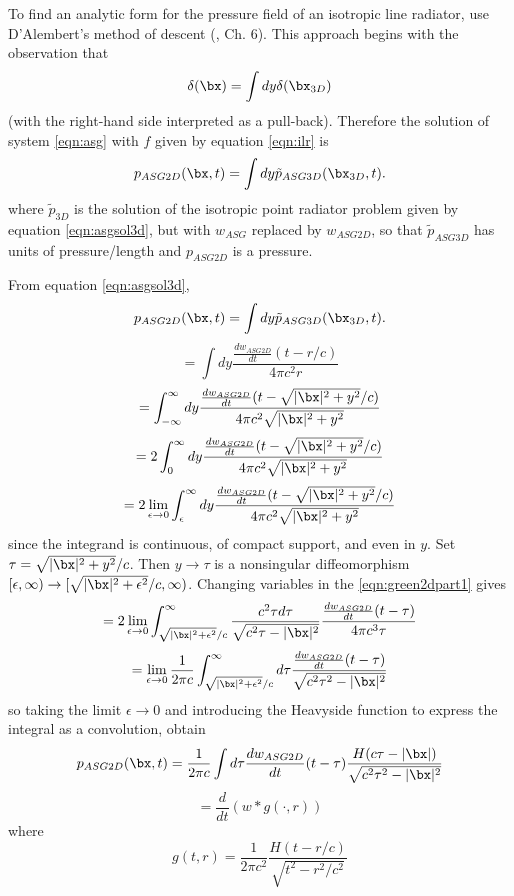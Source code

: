 To find an analytic form for the pressure field of an isotropic line radiator, use D'Alembert's method of descent (\cite{CourHil:62}, Ch. 6). This approach begins with the observation that
\[
\delta(\bx) = \int dy \delta(\bx_{3D})
\]
(with the right-hand side interpreted as a pull-back). Therefore the solution of system \ref{eqn:asg} with $f$ given by equation \ref{eqn:ilr} is  
\begin{equation}
\label{eqn:descent}
p_{ASG2D}(\bx,t) = \int dy \tilde{p}_{ASG3D}(\bx_{3D},t).
\end{equation}
where $\tilde{p}_{3D}$ is the solution of the isotropic point radiator problem given by equation \ref{eqn:asgsol3d}, but with $w_{ASG}$ replaced by $w_{ASG2D}$, so that $\tilde{p}_{ASG3D}$ has units of pressure/length and $p_{ASG2D}$ is a pressure.

From equation \ref{eqn:asgsol3d},
\[
p_{ASG2D}(\bx,t) = \int dy \tilde{p}_{ASG3D}(\bx_{3D},t).
\]
\[
= \int dy \frac{\frac{dw_{ASG2D}}{dt}(t-r/c)}{4\pi c^2 r}
\]
\[
= \int_{-\infty}^{\infty} dy \frac{\frac{dw_{ASG2D}}{dt}(t-\sqrt{|\bx|^2 + y^2}/c)}{4\pi c^2 \sqrt{|\bx|^2 + y^2}}
\]
\[
= 2 \int_0^{\infty} dy \frac{\frac{dw_{ASG2D}}{dt}(t-\sqrt{|\bx|^2 + y^2}/c)}{4\pi c^2 \sqrt{|\bx|^2 + y^2}}
\]
\begin{equation}
\label{eqn:green2dpart1}
= 2 \lim_{\epsilon \rightarrow 0}\int_{\epsilon}^{\infty} dy \frac{\frac{dw_{ASG2D}}{dt}(t-\sqrt{|\bx|^2 + y^2}/c)}{4\pi c^2\sqrt{|\bx|^2 + y^2}}
\end{equation}
since the integrand is continuous, of compact support, and even in $y$. Set $\tau = \sqrt{|\bx|^2 + y^2}/c$. Then $y \rightarrow \tau$ is a nonsingular diffeomorphism $[\epsilon,\infty) \rightarrow [\sqrt{|\bx|^2+\epsilon^2}/c,\infty)$. Changing variables in the \ref{eqn:green2dpart1} gives
\[
= 2 \lim_{\epsilon \rightarrow 0} \int_{\sqrt{|\bx|^2+\epsilon^2}/c}^{\infty} \frac{c^2 \tau d\tau}{\sqrt{c^2 \tau - |\bx|^2}} \frac{\frac{dw_{ASG2D}}{dt}(t-\tau)}{4\pi c^3 \tau} 
\]
\[
=\lim_{\epsilon \rightarrow 0} \frac{1}{2\pi c}\int_{\sqrt{|\bx|^2+\epsilon^2}/c}^{\infty} d\tau \frac{\frac{dw_{ASG2D}}{dt}(t-\tau)}{\sqrt{c^2 \tau^2 -|\bx|^2}}
\]
so taking the limit $\epsilon \rightarrow 0$ and introducing the
Heavyside function to express the integral as a convolution, obtain
\[
p_{ASG2D}(\bx,t) = \frac{1}{2\pi c}\int d\tau
\frac{dw_{ASG2D}}{dt}(t-\tau)\frac{H(c\tau-|\bx|)}{\sqrt{c^2 \tau^2
    -|\bx|^2}}
\]
\begin{equation}
\label{eqn:asgsol2d}
= \frac{d}{dt}(w * g(\cdot,r))
\end{equation}
where
\begin{equation}
  \label{eqn:green2dsing}
  g(t,r) = \frac{1}{2\pi c^2}\frac{H(t-r/c)}{\sqrt{t^2 -r^2/c^2}}
\end{equation}

